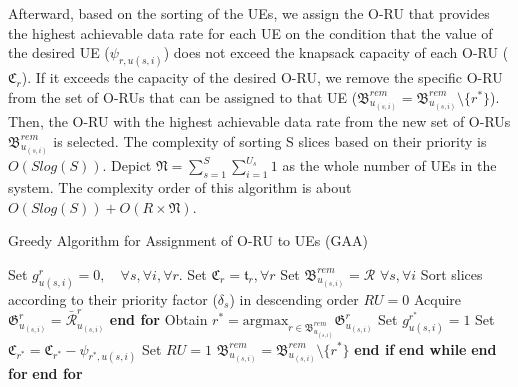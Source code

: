 \documentclass[conference]{IEEEtran}
\begin{document}
Afterward, based on the sorting of the UEs,
we assign the O-RU that provides the highest achievable data rate for each UE on the condition that the value of the desired UE ($\psi_{r,u(s,i)}$) does not exceed the knapsack capacity of each O-RU ($ \mathfrak{C}_r$).
If it exceeds the capacity of the desired O-RU, we remove the specific O-RU from the set of O-RUs that can be assigned to that UE (${\mathfrak{B}}^{rem}_{u_{(s,i)}} = {\mathfrak{B}}^{rem}_{u_{(s,i)}} \setminus \{{r^*}\} $). Then, the O-RU with the highest achievable data rate from the new set of O-RUs ${\mathfrak{B}}^{rem}_{u_{(s,i)}}$ is selected. 
The complexity of sorting S slices based on their priority is $O(Slog(S))$.
Depict $\mathfrak{N} =  \sum_{s=1}^S\sum_{i=1}^{U_s} 1$ as the whole number of UEs in the system. 
The complexity order of this algorithm is about $O(Slog(S)) + O(R\times \mathfrak{N})$.
\begin{algorithm}
\caption{Greedy Algorithm for Assignment of O-RU to UEs (GAA)}\label{alg1}
\begin{algorithmic}[1]
\State Set $g^r_{u(s,i)} = 0, \quad \forall s, \forall i, \forall r$.\label{31}
\State Set $\mathfrak{C}_r = \mathfrak{t}_r, \forall r$  \label{32}
\State Set ${\mathfrak{B}}^{rem}_{u_{(s,i)}} = \mathcal{R}$  $\forall s, \forall i$
\State Sort slices according to their priority factor ($\delta_s$) in descending order
\label{33}
\State $RU = 0$
\State Acquire $\mathfrak{G}^r_{u_{(s,i)}} = \bar{\mathcal{R}}^r_{u_{(s,i)}}$
\EndFor
\State \textbf{end for}
\State Obtain $r^* = \text{argmax}_{r\in{\mathfrak{B}}^{rem}_{u_{(s,i)}}} \mathfrak{G}^r_{u_{(s,i)}}$
\State Set $g^{r^*}_{u(s,i)} = 1$ 
\State Set  $\mathfrak{C}_{r^*} = \mathfrak{C}_{r^*} - \psi_{{r^*},u(s,i)}$
\State Set $RU = 1$ 
\Else
\State  ${\mathfrak{B}}^{rem}_{u_{(s,i)}} = {\mathfrak{B}}^{rem}_{u_{(s,i)}} \setminus \{{r^*}\} $
\EndIf
\State \textbf{end if}
\EndWhile
\State \textbf{end while}
\EndFor
\State \textbf{end for}
\EndFor
\State \textbf{end for} \label{34}
\end{algorithmic}
\end{algorithm} 
\end{document}
